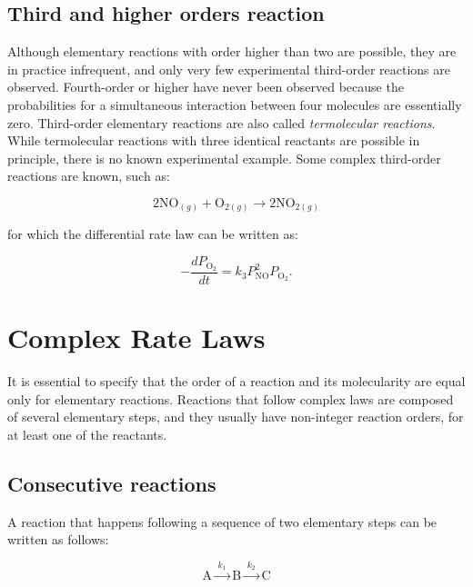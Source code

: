 \documentclass[
  9pt,
]{extbook}
\theoremstyle{definition}
\theoremstyle{definition}
\theoremstyle{definition}
\theoremstyle{remark}
\begin{document}
\hypertarget{third-and-higher-orders-reaction}{%
\subsection{Third and higher orders reaction}\label{third-and-higher-orders-reaction}}

Although elementary reactions with order higher than two are possible, they are in practice infrequent, and only very few experimental third-order reactions are observed. Fourth-order or higher have never been observed because the probabilities for a simultaneous interaction between four molecules are essentially zero. Third-order elementary reactions are also called \emph{termolecular reactions}. While termolecular reactions with three identical reactants are possible in principle, there is no known experimental example. Some complex third-order reactions are known, such as:

\begin{equation}
2\text{NO}_{(g)}+\text{O}_{2(g)}\longrightarrow 2\text{NO}_{2(g)}
\end{equation}

for which the differential rate law can be written as:

\begin{equation}
-\frac{dP_{\mathrm{O}_2}}{dt}=k_3 P_{\mathrm{NO}}^2 P_{\mathrm{O}_2}.
\label{eq:kin17}
\end{equation}

\hypertarget{complex-rate-laws}{%
\section{Complex Rate Laws}\label{complex-rate-laws}}

It is essential to specify that the order of a reaction and its molecularity are equal only for elementary reactions. Reactions that follow complex laws are composed of several elementary steps, and they usually have non-integer reaction orders, for at least one of the reactants.

\hypertarget{consecutive-reactions}{%
\subsection{Consecutive reactions}\label{consecutive-reactions}}

A reaction that happens following a sequence of two elementary steps can be written as follows:

\begin{equation}
\text{A}\xrightarrow{\;k_1\;}\text{B}\xrightarrow{\;k_2\;}\text{C}
\end{equation}
\end{document}
